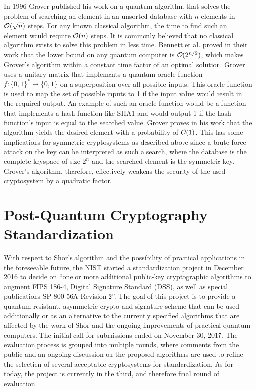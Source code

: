 In 1996 Grover published his work on a quantum algorithm that solves the problem of searching an element in an unsorted database with \(n\) elements in \(\mathcal{O}(\sqrt{n})\) steps. For any known classical algorithm, the time to find such an element would require \(\mathcal{O}(n)\) steps. It is commonly believed that no classical algorithm exists to solve this problem in less time. Bennett et al. proved in their work that the lower bound on any quantum computer is \(\mathcal{O}(2^{n/2})\)\cite{bennett1997strengths}, which makes Grover's algorithm within a constant time factor of an optimal solution. Grover uses a unitary matrix that implements a quantum oracle function \(f: \{0,1\}^* \to \{0,1\}\) on a superposition over all possible inputs. This oracle function is used to map the set of possible inputs to 1 if the input value would result in the required output. An example of such an oracle function would be a function that implements a hash function like SHA1 and would output 1 if the hash function's input is equal to the searched value. Grover proves in his work that the algorithm yields the desired element with a probability of \(\mathcal{O}(1)\)\cite{grover1996fast}. This has some implications for symmetric cryptosystems as described above since a brute force attack on the key can be interpreted as such a search, where the database is the complete keyspace of size \(2^n\) and the searched element is the symmetric key. Grover's algorithm, therefore, effectively weakens the security of the used cryptosystem by a quadratic factor.

\section{Post-Quantum Cryptography Standardization}
With respect to Shor's algorithm and the possibility of practical applications in the foreseeable future, the \ac{NIST} started a standardization project in December 2016 to decide on ``one or more additional public-key cryptographic algorithms to augment \ac{FIPS} 186-4, Digital Signature Standard (DSS), as well as special publications SP 800-56A Revision 2''. The goal of this project is to provide a quantum-resistant, asymmetric crypto and signature scheme that can be used additionally or as an alternative to the currently specified algorithms that are affected by the work of Shor and the ongoing improvements of practical quantum computers. The initial call for submissions ended on November 30, 2017. The evaluation process is grouped into multiple rounds, where comments from the public and an ongoing discussion on the proposed algorithms are used to refine the selection of several acceptable cryptosystems for standardization. As for today, the project is currently in the third, and therefore final round of evaluation.


